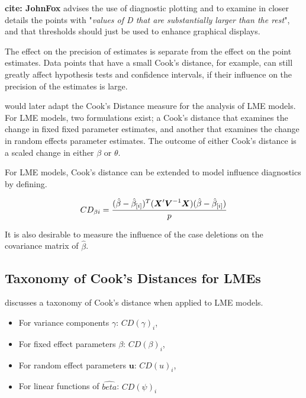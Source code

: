 \documentclass[12pt, a4paper]{report}
\theoremstyle{plain}
\theoremstyle{definition}
\theoremstyle{remark}
\begin{document}
\textbf{cite: JohnFox} advises the use of diagnostic plotting and to examine in closer details the points with "\textit{values of D that are substantially larger than the rest}", and that thresholds should just be used to enhance graphical displays.


The effect on the precision of estimates is separate from the effect on the point estimates. Data points that have a small Cook's distance, for example, can still greatly affect hypothesis tests and confidence intervals, if their  influence on the precision of the estimates is large.

%
%
\citet{Christensen} would later adapt the Cook's Distance measure for the analysis of LME models. For LME models, two formulations exist; a Cook's distance that examines the change in fixed fixed parameter estimates, and another that examines the change in random effects parameter estimates. The outcome of either Cook's distance is a scaled change in either $\beta$ or $\theta$.

For LME models, Cook's distance can be extended to model influence diagnostics by defining.

\[ CD_{\beta i} = {(\hat{\beta} - \hat{\beta}_{[i]})^{T}(\boldsymbol{X}^{\prime}\boldsymbol{V}^{-1}\boldsymbol{X}) (\hat{\beta} - \hat{\beta}_{[i]}) \over p}\]

It is also desirable to measure the influence of the case deletions on the covariance matrix of $\hat{\beta}$.

\subsection{Taxonomy of Cook's Distances for LMEs}
\citet{schabenberger} discusses a taxonomy of Cook's distance when applied to LME models. \begin{itemize}
	\item For variance components $\gamma$: $CD(\gamma)_i$,
	\item For fixed effect parameters $\beta$: $CD(\beta)_i$,
	\item For random effect parameters $\boldsymbol{u}$: $CD(u)_i$,
	\item For linear functions of $\hat{beta}$: $CD(\psi)_i$
\end{itemize}			
\end{document}
